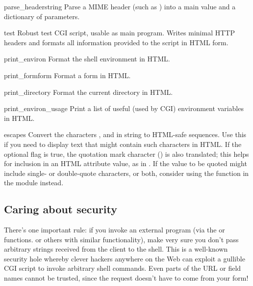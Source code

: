 \begin{funcdesc}{parse_header}{string}
Parse a MIME header (such as ) into a main
value and a dictionary of parameters.
\end{funcdesc}

\begin{funcdesc}{test}{}
Robust test CGI script, usable as main program.
Writes minimal HTTP headers and formats all information provided to
the script in HTML form.
\end{funcdesc}

\begin{funcdesc}{print_environ}{}
Format the shell environment in HTML.
\end{funcdesc}

\begin{funcdesc}{print_form}{form}
Format a form in HTML.
\end{funcdesc}

\begin{funcdesc}{print_directory}{}
Format the current directory in HTML.
\end{funcdesc}

\begin{funcdesc}{print_environ_usage}{}
Print a list of useful (used by CGI) environment variables in
HTML.
\end{funcdesc}

\begin{funcdesc}{escape}{s}
Convert the characters
\character{\&}, \character{<} and \character{>} in string  to
HTML-safe sequences.  Use this if you need to display text that might
contain such characters in HTML.  If the optional flag  is
true, the quotation mark character () is also translated;
this helps for inclusion in an HTML attribute value, as in .  If the value to be quoted might include single- or
double-quote characters, or both, consider using the
 function in the 
module instead.
\end{funcdesc}


\subsection{Caring about security \label{cgi-security}}


There's one important rule: if you invoke an external program (via the
 or  functions. or others
with similar functionality), make very sure you don't pass arbitrary
strings received from the client to the shell.  This is a well-known
security hole whereby clever hackers anywhere on the Web can exploit a
gullible CGI script to invoke arbitrary shell commands.  Even parts of
the URL or field names cannot be trusted, since the request doesn't
have to come from your form!


